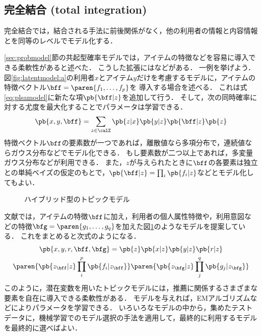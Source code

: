 

\subsection{完全結合 (total integration)}

完全結合では，結合される手法に前後関係がなく，他の利用者の情報と内容情報とを同等のレベルでモデル化する．

\ref{sec:probmodel}節の共起型確率モデルでは，アイテムの特徴などを容易に導入できる柔軟性があると述べた．
こうした拡張には\cite{uai:01:01,ijcai:05:01,trieice:06:04,tripsj:06:02,tieice:07:02}などがある．
一例を挙げよう．
図\ref{fig:latentmodel:a}の利用者$x$とアイテム$y$だけを考慮するモデルに，アイテムの特徴ベクトル$\bff=\paren{f_1,\dotsc,f_p}$を
導入する場合を述べる．
これは式\eqref{eq:plsamodel}に新たな項$\pb{\bff|z}$を追加して行う．
そして，次の同時確率に対する尤度を最大化することでパラメータは学習できる．
\[
 \pb{x,y,\bff} = \sum_{z\in\calZ} \pb{z|x} \pb{y|z}\pb{\bff|z}\pb{z}
\]
特徴ベクトル$\bff$の要素数が一つであれば，離散値なら多項分布で，連続値ならガウス分布などでモデル化できる．
もし要素数が二つ以上であれば，多変量ガウス分布などが利用できる．
また，$z$が与えられたときに$\bff$の各要素は独立との単純ベイズの仮定のもとで，$\pb{\bff|z}=\prod_i\pb{f_i|z}$などとモデル化してもよい．

\begin{figure}
\centering
{}
\caption{ハイブリッド型のトピックモデル\cite{trieice:06:04}}
\label{fig:combined-topicmodel}
\end{figure}

文献\cite{trieice:06:04}では，アイテムの特徴$\bff$に加え，利用者の個人属性特徴や，利用意図などの特徴$\bfg=\paren{g_1,\dotsc,g_q}$を加えた図\ref{fig:combined-topicmodel}のようなモデルを提案している．
これをまとめると次式のようになる．
\begin{multline*}
\pb{x,y,r,\bff,\bfg} =
 \pb{z}\pb{x|z}\pb{y|z}\pb{r|z}\\
\paren{\pb{z_\bff|z}\prod_i^p\pb{f_i|z_\bff}}
\paren{\pb{z_\bfg|z}\prod_j^q\pb{g_j|z_\bfg}}
\end{multline*}
%
このように，潜在変数を用いたトピックモデルには，推薦に関係するさまざまな要素を自在に導入できる柔軟性がある．
モデルを与えれば，EMアルゴリズムなどによりパラメータを学習できる．
いろいろなモデルの中から，集めたテストデータに，機械学習でのモデル選択の手法を適用して，最終的に利用するモデルを最終的に選べばよい．

